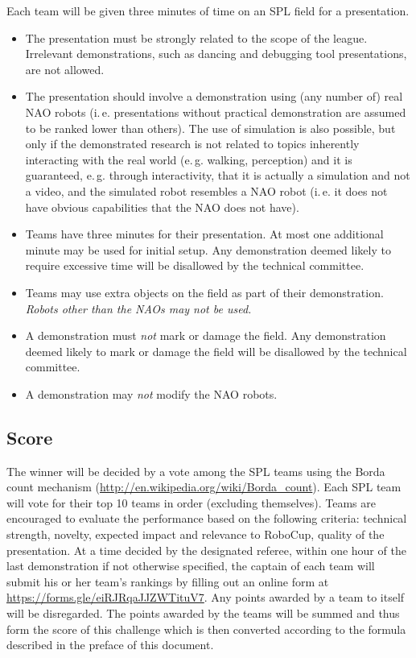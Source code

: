 \documentclass[12pt]{article}
\newcommand{\ie}{\mbox{i.\,e.}\xspace}
\newcommand{\eg}{\mbox{e.\,g.}\xspace}
\begin{document}
Each team will be given three minutes of time on an SPL field for a presentation.

\begin{itemize}
\item The presentation must be strongly related to the scope of the league. Irrelevant demonstrations, such as dancing and debugging tool presentations, are not allowed.
\item The presentation should involve a demonstration using (any number of) real NAO robots (\ie presentations without practical demonstration are assumed to be ranked lower than others). The use of simulation is also possible, but only if the demonstrated research is not related to topics inherently interacting with the real world (\eg walking, perception) and it is guaranteed, \eg through interactivity, that it is actually a simulation and not a video, and the simulated robot resembles a NAO robot (\ie it does not have obvious capabilities that the NAO does not have).
\item Teams have three minutes for their presentation. At most one additional minute may be used for initial setup. Any demonstration deemed likely to require excessive time will be disallowed by the technical committee.
\item Teams may use extra objects on the field as part of their demonstration. \emph{Robots other than the NAOs may not be used.}
\item A demonstration must \emph{not} mark or damage the field. Any demonstration deemed likely to mark or damage the field will be disallowed by the technical committee.
\item A demonstration may \emph{not} modify the NAO robots.
\end{itemize}

\subsection{Score}

The winner will be decided by a vote among the SPL teams using the Borda count mechanism (\url{http://en.wikipedia.org/wiki/Borda_count}). Each SPL team will vote for their top 10 teams in order (excluding themselves). Teams are encouraged to evaluate the performance based on the following criteria: technical strength, novelty, expected impact and relevance to RoboCup, quality of the presentation. At a time decided by the designated referee, within one hour of the last demonstration if not otherwise specified, the captain of each team will submit his or her team's rankings by filling out an online form at \url{https://forms.gle/eiRJRqaJJZWTituV7}. Any points awarded by a team to itself will be disregarded. The points awarded by the teams will be summed and thus form the score of this challenge which is then converted according to the formula described in the preface of this document.
\end{document}
